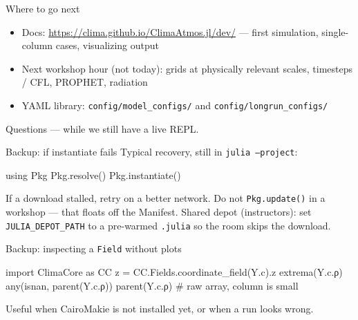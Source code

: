 \documentclass[aspectratio=169,11pt]{beamer}
\begin{document}
\begin{frame}{Where to go next}
\begin{itemize}
  \item Docs: \url{https://clima.github.io/ClimaAtmos.jl/dev/}
        --- first simulation, single-column cases, visualizing output
  \item Next workshop hour (not today): grids at physically relevant scales,
        timesteps / CFL, PROPHET, radiation
  \item YAML library: \texttt{config/model\_configs/} and
        \texttt{config/longrun\_configs/}
\end{itemize}
\vspace{0.8em}
\begin{center}
\large Questions --- while we still have a live REPL.
\end{center}
\end{frame}

\appendix
\begin{frame}[fragile]{Backup: if instantiate fails}
Typical recovery, still in \texttt{julia --project}:
\begin{semiverbatim}
using Pkg
Pkg.resolve()
Pkg.instantiate()
\end{semiverbatim}
\vspace{0.4em}
If a download stalled, retry on a better network. Do not \texttt{Pkg.update()}
in a workshop --- that floats off the Manifest.
\vspace{0.4em}
Shared depot (instructors): set \texttt{JULIA\_DEPOT\_PATH} to a pre-warmed
\texttt{.julia} so the room skips the download.
\end{frame}

\begin{frame}[fragile]{Backup: inspecting a \texttt{Field} without plots}
\begin{semiverbatim}
import ClimaCore as CC
z = CC.Fields.coordinate_field(Y.c).z
extrema(Y.c.ρ)
any(isnan, parent(Y.c.ρ))
parent(Y.c.ρ)          # raw array, column is small
\end{semiverbatim}
Useful when CairoMakie is not installed yet, or when a run looks wrong.
\end{frame}
\end{document}
